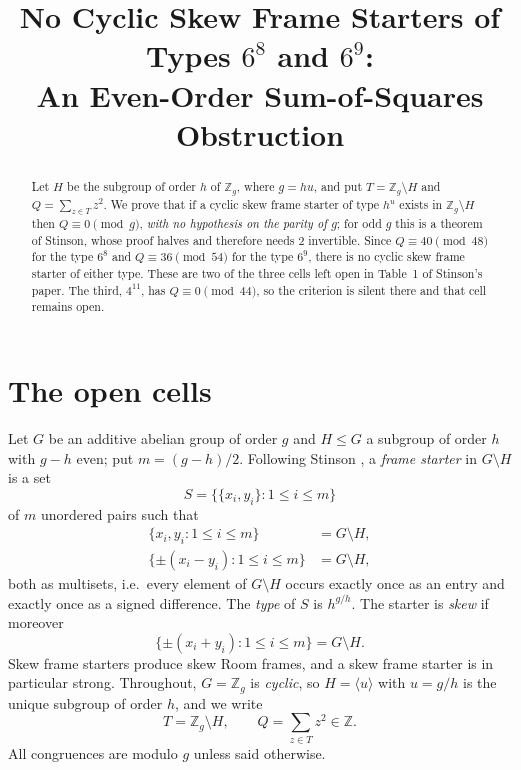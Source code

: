 \documentclass[11pt]{amsart}
\title[No cyclic skew frame starters of types $6^8$ and $6^9$]
{No Cyclic Skew Frame Starters of Types $6^{8}$ and $6^{9}$:\\
An Even-Order Sum-of-Squares Obstruction}
\date{}
\theoremstyle{remark}
\begin{document}
\begin{abstract}
Let $H$ be the subgroup of order $h$ of $\mathbb Z_g$, where $g=hu$, and put
$T=\mathbb Z_g\setminus H$ and $Q=\sum_{z\in T}z^{2}$. We prove that if a
cyclic skew frame starter of type $h^{u}$ exists in $\mathbb Z_g\setminus H$
then $Q\equiv0\pmod g$, \emph{with no hypothesis on the parity of $g$}; for
odd $g$ this is a theorem of Stinson, whose proof halves and therefore needs
$2$ invertible. Since $Q\equiv40\pmod{48}$ for the type $6^{8}$ and
$Q\equiv36\pmod{54}$ for the type $6^{9}$, there is no cyclic skew frame
starter of either type. These are two of the three cells left open in
Table~1 of Stinson's paper. The third, $4^{11}$, has $Q\equiv0\pmod{44}$, so
the criterion is silent there and that cell remains open.
\end{abstract}

\maketitle

\section{The open cells}

Let $G$ be an additive abelian group of order $g$ and $H\le G$ a subgroup of
order $h$ with $g-h$ even; put $m=(g-h)/2$. Following Stinson
\cite[\S1]{Stinson23}, a \emph{frame starter} in $G\setminus H$ is a set
\[
  S=\bigl\{\{x_i,y_i\}: 1\le i\le m\bigr\}
\]
of $m$ unordered pairs such that
\begin{align}
  \{x_i,y_i : 1\le i\le m\} &= G\setminus H, \label{eq:P1}\\
  \{\pm(x_i-y_i) : 1\le i\le m\} &= G\setminus H, \label{eq:P2}
\end{align}
both as multisets, i.e.\ every element of $G\setminus H$ occurs exactly once
as an entry and exactly once as a signed difference. The \emph{type} of $S$ is
$h^{g/h}$. The starter is \emph{skew} if moreover
\begin{equation}
  \{\pm(x_i+y_i) : 1\le i\le m\} = G\setminus H. \label{eq:P3}
\end{equation}
Skew frame starters produce skew Room frames, and a skew frame starter is in
particular strong. Throughout, $G=\mathbb Z_g$ is \emph{cyclic}, so
$H=\langle u\rangle$ with $u=g/h$ is the unique subgroup of order $h$, and we
write
\[
  T=\mathbb Z_g\setminus H,\qquad Q=\sum_{z\in T}z^{2}\in\mathbb Z .
\]
All congruences are modulo $g$ unless said otherwise.
\end{document}

